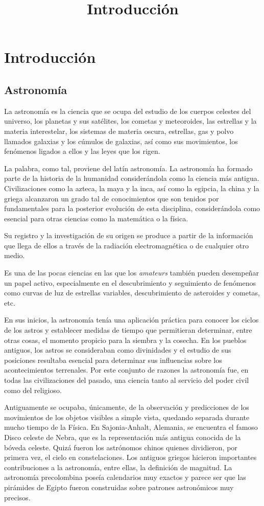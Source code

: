 \chapter{Introducción}
\title{Introducción}
\label{cap:Introduccion}


\section{Astronomía}
La astronomía es la ciencia que se ocupa del estudio de los cuerpos celestes del universo, los planetas y sus satélites, los cometas y meteoroides, las estrellas y la materia interestelar, los sistemas de materia oscura, estrellas, gas y polvo llamados galaxias y los cúmulos de galaxias, así como sus movimientos, los fenómenos ligados a ellos y las leyes que los rigen.

La palabra, como tal, proviene del latín astronomía. La astronomía ha formado parte de la historia de la humanidad considerándola como la ciencia más antigua. Civilizaciones como la azteca, la maya y la inca, así como la egipcia, la china y la griega alcanzaron un grado tal de conocimientos que son tenidos por fundamentales para la posterior evolución de esta disciplina, considerándola como esencial para otras ciencias como la matemática o la física.

Su registro y la investigación de su origen se produce a partir de la información que llega de ellos a través de la radiación electromagnética o de cualquier otro medio.

Es una de las pocas ciencias en las que los \textit{amateurs} también pueden desempeñar un papel activo, especialmente en el descubrimiento y seguimiento de fenómenos como curvas de luz de estrellas variables, descubrimiento de asteroides y cometas, etc.

En sus inicios, la astronomía tenía una aplicación práctica para conocer los ciclos de los astros y establecer medidas de tiempo que permitieran determinar, entre otras cosas, el momento propicio para la siembra y la cosecha. En los pueblos antiguos, los astros se consideraban como divinidades y el estudio de sus posiciones resultaba esencial para determinar sus influencias sobre los acontecimientos terrenales. Por este conjunto de razones la astronomía fue, en todas las civilizaciones del pasado, una ciencia tanto al servicio del poder civil como del religioso.

Antiguamente se ocupaba, únicamente, de la observación y predicciones de los movimientos de los objetos visibles a simple vista, quedando separada durante mucho tiempo de la Física. En Sajonia-Anhalt, Alemania, se encuentra el famoso Disco celeste de Nebra, que es la representación más antigua conocida de la bóveda celeste. Quizá fueron los astrónomos chinos quienes dividieron, por primera vez, el cielo en constelaciones. Los antiguos griegos hicieron importantes contribuciones a la astronomía, entre ellas, la definición de magnitud. La astronomía precolombina poseía calendarios muy exactos y parece ser que las pirámides de Egipto fueron construidas sobre patrones astronómicos muy precisos.

